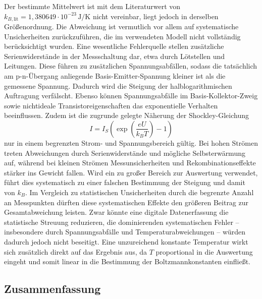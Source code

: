 \documentclass[a4paper,10pt,twocolumn]{scrartcl} %
\begin{document}
	\noindent Der bestimmte Mittelwert ist mit dem Literaturwert von 
	\( k_{B,\text{lit}} = 1{,}380649 \cdot 10^{-23}\,\mathrm{J/K} \) 
	nicht vereinbar, liegt jedoch in derselben Größenordnung. 
	Die Abweichung ist vermutlich vor allem auf systematische Unsicherheiten zurückzuführen, 
	die im verwendeten Modell nicht vollständig berücksichtigt wurden.
	Eine wesentliche Fehlerquelle stellen zusätzliche Serienwiderstände in der Messschaltung dar, 
	etwa durch Lötstellen und Leitungen. Diese führen zu zusätzlichen Spannungsabfällen, 
	sodass die tatsächlich am p-n-Übergang anliegende Basis-Emitter-Spannung kleiner ist 
	als die gemessene Spannung. Dadurch wird die Steigung der halblogarithmischen Auftragung verfälscht. 
	Ebenso können Spannungsabfälle im Basis-Kollektor-Zweig sowie nichtideale Transistoreigenschaften 
	das exponentielle Verhalten beeinflussen.
	Zudem ist die zugrunde gelegte Näherung der Shockley-Gleichung
	\[
	I = I_S \left( \exp\left( \frac{eU}{k_B T} \right) - 1 \right)
	\]
	nur in einem begrenzten Strom- und Spannungsbereich gültig. 
	Bei hohen Strömen treten Abweichungen durch Serienwiderstände und mögliche Selbsterwärmung auf, 
	während bei kleinen Strömen Messunsicherheiten und Rekombinationseffekte stärker ins Gewicht fallen. 
	Wird ein zu großer Bereich zur Auswertung verwendet, führt dies systematisch zu einer falschen 
	Bestimmung der Steigung und damit von \( k_B \).
	Im Vergleich zu statistischen Unsicherheiten durch die begrenzte Anzahl an Messpunkten 
	dürften diese systematischen Effekte den größeren Beitrag zur Gesamtabweichung leisten. 
	Zwar könnte eine digitale Datenerfassung die statistische Streuung reduzieren, 
	die dominierenden systematischen Fehler -- insbesondere durch Spannungsabfälle 
	und Temperaturabweichungen -- würden dadurch jedoch nicht beseitigt. 
	Eine unzureichend konstante Temperatur wirkt sich zusätzlich direkt auf das Ergebnis aus, 
	da \( T \) proportional in die Auswertung eingeht und somit linear in die Bestimmung 
	der Boltzmannkonstanten einfließt.

		\subsection{Zusammenfassung}
\end{document}
